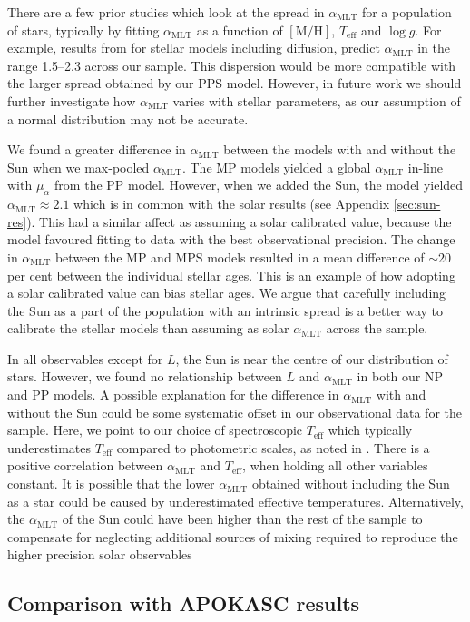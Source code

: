 \documentclass[a4paper,fleqn,usenatbib]{mnras}
\newcommand{\metallicity}{\ensuremath{[\mathrm{M}/\mathrm{H}]}}
\newcommand{\teff}{\ensuremath{T_\mathrm{eff}}}
\newcommand{\mlt}{\ensuremath{{\alpha_\mathrm{MLT}}}}
\begin{document}
There are a few prior studies which look at the spread in $\mlt$ for a population of stars, typically by fitting $\mlt$ as a function of $\metallicity$, $\teff$ and $\log g$. For example, results from \citet{Viani.Basu.ea2018} for stellar models including diffusion, predict $\mlt$ in the range \numrange{1.5}{2.3} across our sample. This dispersion would be more compatible with the larger spread obtained by our PPS model. However, in future work we should further investigate how $\mlt$ varies with stellar parameters, as our assumption of a normal distribution may not be accurate.

We found a greater difference in $\mlt$ between the models with and without the Sun when we max-pooled $\mlt$. The MP models yielded a global $\mlt$ in-line with $\mu_\alpha$ from the PP model. However, when we added the Sun, the model yielded $\mlt \approx 2.1$ which is in common with the solar results (see Appendix \ref{sec:sun-res}). This had a similar affect as assuming a solar calibrated value, because the model favoured fitting to data with the best observational precision. The change in $\mlt$ between the MP and MPS models resulted in a mean difference of $\sim 20$ per cent between the individual stellar ages. This is an example of how adopting a solar calibrated value can bias stellar ages. We argue that carefully including the Sun as a part of the population with an intrinsic spread is a better way to calibrate the stellar models than assuming as solar $\mlt$ across the sample.

In all observables except for $L$, the Sun is near the centre of our distribution of stars. However, we found no relationship between $L$ and $\mlt$ in both our NP and PP models. A possible explanation for the difference in $\mlt$ with and without the Sun could be some systematic offset in our observational data for the sample. Here, we point to our choice of spectroscopic $\teff$ which typically underestimates $\teff$ compared to photometric scales, as noted in . There is a positive correlation between $\mlt$ and $\teff$, when holding all other variables constant. It is possible that the lower $\mlt$ obtained without including the Sun as a star could be caused by underestimated effective temperatures. Alternatively, the $\mlt$ of the Sun could have been higher than the rest of the sample to compensate for neglecting additional sources of mixing required to reproduce the higher precision solar observables

\subsection{Comparison with APOKASC results}\label{sec:comp}
\end{document}
